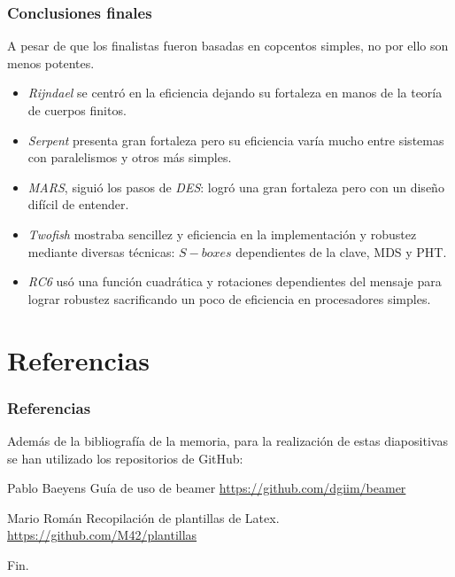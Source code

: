 \documentclass{beamer}
\begin{document}
	\begin{frame}
	\frametitle{Conclusiones finales}
		A pesar de que los finalistas fueron basadas en copcentos simples, no por ello son menos potentes.
		
		\begin{itemize}
			\item \textit{Rijndael} se centró en la eficiencia dejando su fortaleza en manos de la teoría de cuerpos finitos.
			
			\item \textit{Serpent} presenta gran fortaleza pero su eficiencia varía mucho entre sistemas con paralelismos y otros más simples.
			
			\item \textit{MARS}, siguió los pasos de \textit{DES}: logró una gran fortaleza pero con un diseño difícil de entender.
			
			\item \textit{Twofish} mostraba sencillez y eficiencia en la implementación y robustez mediante diversas técnicas: $S-boxes$ dependientes de la clave, MDS y PHT.
			
			\item \textit{RC6} usó una función cuadrática y rotaciones dependientes del mensaje para lograr robustez sacrificando un poco de eficiencia en procesadores simples.
		\end{itemize}
	\end{frame}

\section{Referencias}
\begin{frame}
	\frametitle{Referencias}
	
	Además de la bibliografía de la memoria, para la realización de estas diapositivas se han utilizado los repositorios de GitHub:
	
	\footnotesize{
		\begin{thebibliography}{7} %
			 Pablo Baeyens
			\newblock Guía de uso de beamer
			\newblock \url{https://github.com/dgiim/beamer}
			
			 Mario Román
			\newblock Recopilación de plantillas de Latex.
			\newblock \url{https://github.com/M42/plantillas}
		\end{thebibliography}
	}
\end{frame}
	

\begin{frame}
	\Huge{\centerline{Fin.}}
\end{frame}

\end{document}

